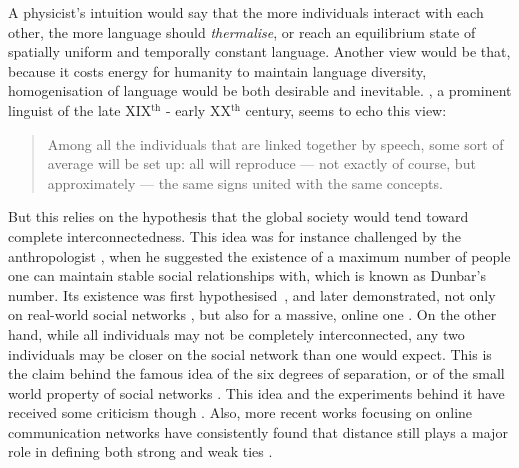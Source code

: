 \documentclass[../thesis.tex]{subfiles}
\begin{document}
A physicist's intuition would say that the more individuals interact with each other,
the more language should \emph{thermalise}, or reach an equilibrium state of spatially
uniform and temporally constant language. Another view would be that, because it costs
energy for humanity to maintain language diversity, homogenisation of language would be
both desirable and inevitable.
, a prominent linguist of the
late XIX$^\text{th}$ - early XX$^\text{th}$ century, seems to echo this view:

\begin{quote}
  Among all the individuals that are linked together by speech, some sort of average
  will be set up: all will reproduce --- not exactly of course, but approximately ---
  the same signs united with the same concepts. \cite{deSaussureCourseGeneral2011}
\end{quote}


But this relies on the hypothesis that the global
society would tend toward complete interconnectedness. This idea was for instance
challenged by the anthropologist , when he
suggested the existence of a maximum number of people one can maintain stable social
relationships with, which is known as Dunbar's number. Its existence was first
hypothesised~\cite{DunbarNeocortexSize1992,DunbarSocialBrain1998}, and later
demonstrated, not only on real-world social networks
\cite{HillSocialNetwork2003,McCartyComparingTwo2005}, but also for a massive, online one
\cite{GoncalvesModelingUsers2011}.
On the other hand, while all individuals may not be completely interconnected, any two
individuals may be closer on the social network than one would expect. This is the claim
behind the famous idea of the six degrees of separation, or of the small world property
of social networks
\cite{deSolaPoolContactsInfluence1978,MilgramSmallWorld1967,TraversExperimentalStudy1977a,WattsCollectiveDynamics1998}.
This idea and the experiments behind it have received some criticism though
\cite{KleinfeldSmallWorld2002}. Also, more recent works focusing on online communication
networks have consistently found that distance still plays a major role in defining both
strong and weak ties
\cite{LeskovecPlanetaryscaleViews2008,TakhteyevGeographyTwitter2012a,Garcia-GavilanesTwitterAin2014}. 
\end{document}

